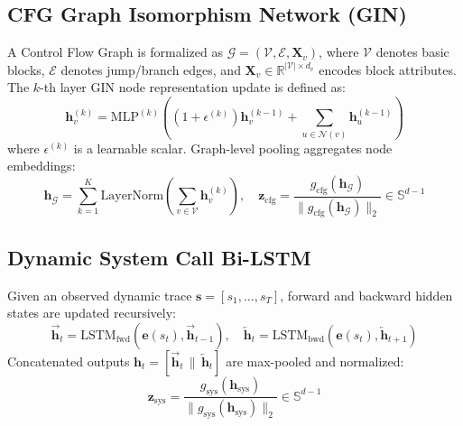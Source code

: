 \documentclass[pdflatex,sn-mathphys-num]{sn-jnl}
\begin{document}
\subsection{CFG Graph Isomorphism Network (GIN)}\label{sec:math_gin}
A Control Flow Graph is formalized as $\mathcal{G} = (\mathcal{V}, \mathcal{E}, \mathbf{X}_v)$, where $\mathcal{V}$ denotes basic blocks, $\mathcal{E}$ denotes jump/branch edges, and $\mathbf{X}_v \in \mathbb{R}^{|\mathcal{V}| \times d_v}$ encodes block attributes. The $k$-th layer GIN node representation update is defined as:
\begin{equation}
\mathbf{h}_v^{(k)} = \text{MLP}^{(k)}\left(\left(1 + \epsilon^{(k)}\right)\mathbf{h}_v^{(k-1)} + \sum_{u \in \mathcal{N}(v)} \mathbf{h}_u^{(k-1)}\right)
\end{equation}
where $\epsilon^{(k)}$ is a learnable scalar. Graph-level pooling aggregates node embeddings:
\begin{equation}
\mathbf{h}_{\mathcal{G}} = \sum_{k=1}^K \text{LayerNorm}\left(\sum_{v \in \mathcal{V}} \mathbf{h}_v^{(k)}\right), \quad \mathbf{z}_{\text{cfg}} = \frac{g_{\text{cfg}}(\mathbf{h}_{\mathcal{G}})}{\|g_{\text{cfg}}(\mathbf{h}_{\mathcal{G}})\|_2} \in \mathbb{S}^{d-1}
\end{equation}

\subsection{Dynamic System Call Bi-LSTM}\label{sec:math_syscall}
Given an observed dynamic trace $\mathbf{s} = [s_1, \dots, s_T]$, forward and backward hidden states are updated recursively:
\begin{equation}
\overrightarrow{\mathbf{h}}_t = \text{LSTM}_{\text{fwd}}(\mathbf{e}(s_t), \overrightarrow{\mathbf{h}}_{t-1}), \quad \overleftarrow{\mathbf{h}}_t = \text{LSTM}_{\text{bwd}}(\mathbf{e}(s_t), \overleftarrow{\mathbf{h}}_{t+1})
\end{equation}
Concatenated outputs $\mathbf{h}_t = [\overrightarrow{\mathbf{h}}_t \,\|\, \overleftarrow{\mathbf{h}}_t]$ are max-pooled and normalized:
\begin{equation}
\mathbf{z}_{\text{sys}} = \frac{g_{\text{sys}}(\mathbf{h}_{\text{sys}})}{\|g_{\text{sys}}(\mathbf{h}_{\text{sys}})\|_2} \in \mathbb{S}^{d-1}
\end{equation}
\end{document}
